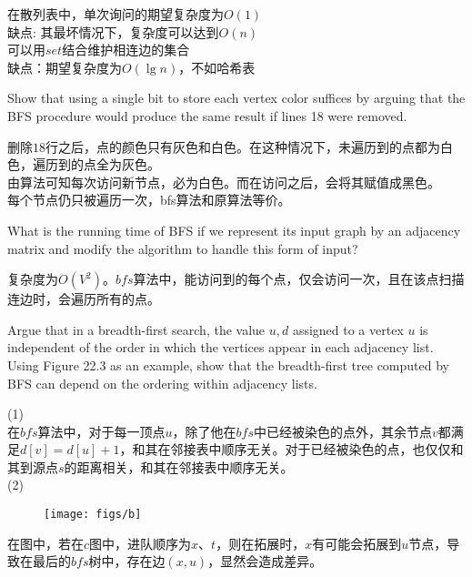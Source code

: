 \documentclass[a4paper, justified]{tufte-handout}
\begin{document}
\begin{solution}
在散列表中，单次询问的期望复杂度为$O(1)$\\
缺点: 其最坏情况下，复杂度可以达到$O(n)$\\
可以用$set$结合维护相连边的集合\\
缺点：期望复杂度为$O(\lg n)$，不如哈希表
\end{solution}

\begin{problem}
Show that using a single bit to store each vertex color suffices by arguing that the BFS procedure would produce the same result if lines 18 were removed.
\end{problem}

\begin{solution}
删除$18$行之后，点的颜色只有灰色和白色。在这种情况下，未遍历到的点都为白色，遍历到的点全为灰色。\\
由算法可知每次访问新节点，必为白色。而在访问之后，会将其赋值成黑色。\\
每个节点仍只被遍历一次，bfs算法和原算法等价。
\end{solution}

\begin{problem}[TC 22.2-4]
What is the running time of BFS if we represent its input graph by an adjacency matrix and modify the algorithm to handle this form of input?
\end{problem}

\begin{solution}
复杂度为$O(V^2)$。$bfs$算法中，能访问到的每个点，仅会访问一次，且在该点扫描连边时，会遍历所有的点。
\end{solution}

\begin{problem}[TC 22.2-5]
Argue that in a breadth-first search, the value $u,d$ assigned to a vertex $u$ is independent of the order in which the vertices appear in each adjacency list. Using Figure 22.3 as an example, show that the breadth-first tree computed by BFS can depend on the ordering within adjacency lists.
\end{problem}

\begin{solution}
(1)\\
在$bfs$算法中，对于每一顶点$u$，除了他在$bfs$中已经被染色的点外，其余节点$v$都满足$d[v] = d[u] + 1$，和其在邻接表中顺序无关。对于已经被染色的点，也仅仅和其到源点$s$的距离相关，和其在邻接表中顺序无关。\\
\newpage
(2)\\
 \begin{figure}[htbp]
    \centering
    \texttt{[image: figs/b]}
  \end{figure}
  
 在图中，若在$c$图中，进队顺序为$x$、$t$，则在拓展时，$x$有可能会拓展到$u$节点，导致在最后的$bfs$树中，存在边$(x,u)$，显然会造成差异。
\end{solution}
\end{document}
